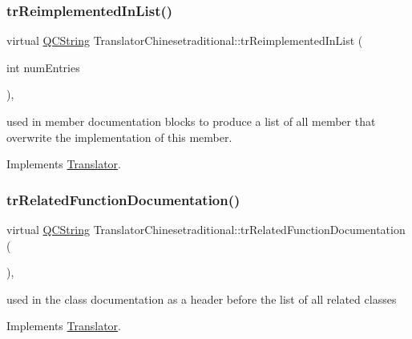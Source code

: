 \subsubsection{\texorpdfstring{trReimplementedInList()}{trReimplementedInList()}}
{\footnotesize\ttfamily virtual \mbox{\hyperlink{class_q_c_string}{Q\+C\+String}} Translator\+Chinesetraditional\+::tr\+Reimplemented\+In\+List (\begin{DoxyParamCaption}\item[{int}]{num\+Entries }\end{DoxyParamCaption})\hspace{0.3cm}{\ttfamily [inline]}, {\ttfamily [virtual]}}

used in member documentation blocks to produce a list of all member that overwrite the implementation of this member. 

Implements \mbox{\hyperlink{class_translator}{Translator}}.

\mbox{\label{class_translator_chinesetraditional_a81f57cd0b4950a7dee0c05399f68a851}} 
\subsubsection{\texorpdfstring{trRelatedFunctionDocumentation()}{trRelatedFunctionDocumentation()}}
{\footnotesize\ttfamily virtual \mbox{\hyperlink{class_q_c_string}{Q\+C\+String}} Translator\+Chinesetraditional\+::tr\+Related\+Function\+Documentation (\begin{DoxyParamCaption}{ }\end{DoxyParamCaption})\hspace{0.3cm}{\ttfamily [inline]}, {\ttfamily [virtual]}}

used in the class documentation as a header before the list of all related classes 

Implements \mbox{\hyperlink{class_translator}{Translator}}.

\mbox{\label{class_translator_chinesetraditional_aca72bb636f7b1d0f89ef3bf76a0ac3a0}} 
